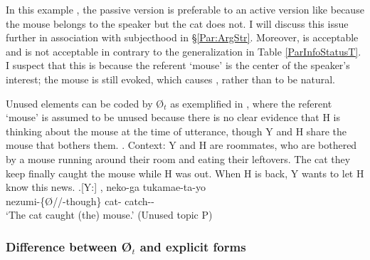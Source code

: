 In this example \Last[-Y5],
the passive version is preferable to an active version like \Last[-Y5]
because the mouse belongs to the speaker but the cat does not.
I will discuss this issue further in association with subjecthood in \S \ref{Par:ArgStr}.
Moreover,
 is acceptable and  is not acceptable in \Last[-Y5]
contrary to the generalization in Table \ref{ParInfoStatusT}.
I suspect that this is because the referent `mouse' is the center of the speaker's interest;
the mouse is still evoked,
which causes , rather than  to be natural.

Unused elements can be coded by {\O$_{t}$}
as exemplified in \Next,
where the referent `mouse' is assumed to be unused
because there is no clear evidence that H is thinking about the mouse at the time of utterance,
though Y and H share the mouse that bothers them.
%
\ex. \label{UnusedMouse}Context: Y and H are roommates,
	who are bothered by a mouse running around their room
	and eating their leftovers.
	The cat they keep finally caught the mouse while H was out.
	When H is back, Y wants to let H know this news.
	\ag.[Y:] , neko-ga tukamae-ta-yo \\
		nezumi-\{{\O}//-though\} cat- catch-- \\
		`The cat caught (the) mouse.' \hfill{(Unused topic P)}


\subsubsection{Difference between {\O$_{t}$} and explicit forms}

